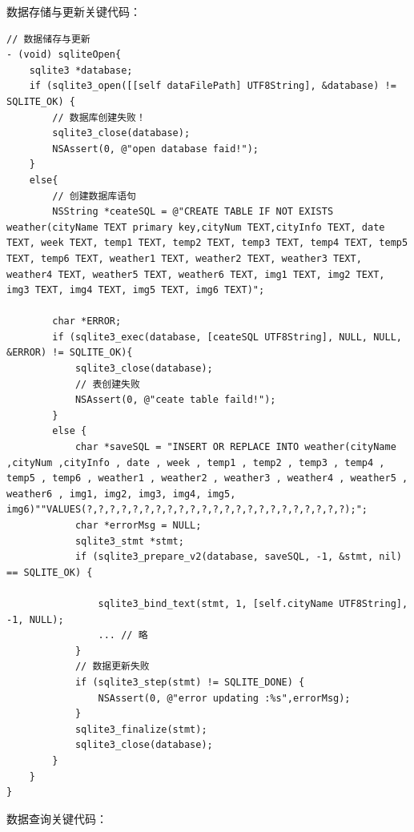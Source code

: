\documentclass[UTF8,nofonts]{ctexart}
\begin{document}
数据存储与更新关键代码：
\begin{lstlisting}[language={[ANSI]C++}]
// 数据储存与更新
- (void) sqliteOpen{
    sqlite3 *database;
    if (sqlite3_open([[self dataFilePath] UTF8String], &database) != SQLITE_OK) {
	    // 数据库创建失败！
        sqlite3_close(database);
        NSAssert(0, @"open database faid!");
    }
    else{
        // 创建数据库语句
        NSString *ceateSQL = @"CREATE TABLE IF NOT EXISTS weather(cityName TEXT primary key,cityNum TEXT,cityInfo TEXT, date TEXT, week TEXT, temp1 TEXT, temp2 TEXT, temp3 TEXT, temp4 TEXT, temp5 TEXT, temp6 TEXT, weather1 TEXT, weather2 TEXT, weather3 TEXT, weather4 TEXT, weather5 TEXT, weather6 TEXT, img1 TEXT, img2 TEXT, img3 TEXT, img4 TEXT, img5 TEXT, img6 TEXT)";
        
        char *ERROR;
        if (sqlite3_exec(database, [ceateSQL UTF8String], NULL, NULL, &ERROR) != SQLITE_OK){
            sqlite3_close(database);
            // 表创建失败
            NSAssert(0, @"ceate table faild!");
        }
        else {
            char *saveSQL = "INSERT OR REPLACE INTO weather(cityName ,cityNum ,cityInfo , date , week , temp1 , temp2 , temp3 , temp4 , temp5 , temp6 , weather1 , weather2 , weather3 , weather4 , weather5 , weather6 , img1, img2, img3, img4, img5, img6)""VALUES(?,?,?,?,?,?,?,?,?,?,?,?,?,?,?,?,?,?,?,?,?,?,?);";
            char *errorMsg = NULL;
            sqlite3_stmt *stmt;
            if (sqlite3_prepare_v2(database, saveSQL, -1, &stmt, nil) == SQLITE_OK) {
                
                sqlite3_bind_text(stmt, 1, [self.cityName UTF8String], -1, NULL);
                ... // 略
            }
            // 数据更新失败
            if (sqlite3_step(stmt) != SQLITE_DONE) {
                NSAssert(0, @"error updating :%s",errorMsg);
            }
            sqlite3_finalize(stmt);
            sqlite3_close(database);
        }
    }
}
\end{lstlisting}
数据查询关键代码：
\end{document}
